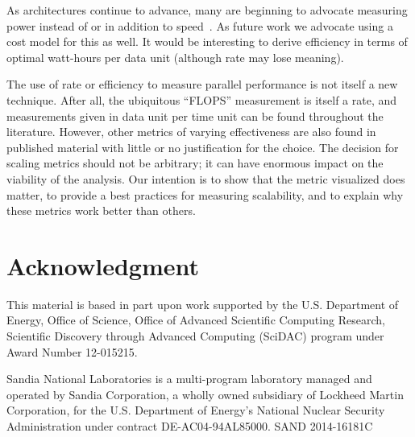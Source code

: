 \documentclass{llncs}
\newcommand*{\lcite}[1]{~\cite{#1}}
\begin{document}
As architectures continue to advance, many are beginning to advocate
measuring power instead of or in addition to speed\lcite{Cameron2012}. As
future work we advocate using a cost model for this as well. It would be
interesting to derive efficiency in terms of optimal watt-hours per data
unit (although rate may lose meaning).

The use of rate or efficiency to measure parallel performance is not itself
a new technique. After all, the ubiquitous ``FLOPS'' measurement is itself
a rate, and measurements given in data unit per time unit can be found
throughout the literature. However, other metrics of varying effectiveness
are also found in published material with little or no justification for
the choice. The decision for scaling metrics should not be arbitrary; it
can have enormous impact on the viability of the analysis. Our intention is
to show that the metric visualized does matter, to provide a best practices
for measuring scalability, and to explain why these metrics work better
than others.


\section*{Acknowledgment}

\noindent
This material is based in part upon work supported by the U.S. Department
of Energy, Office of Science, Office of Advanced Scientific Computing
Research, Scientific Discovery through Advanced Computing (SciDAC) program
under Award Number 12-015215.

Sandia National Laboratories is a multi-program laboratory managed and
operated by Sandia Corporation, a wholly owned subsidiary of Lockheed
Martin Corporation, for the U.S. Department of Energy's National Nuclear
Security Administration under contract DE-AC04-94AL85000. \hfill
{\footnotesize SAND 2014-16181C}



\end{document}
